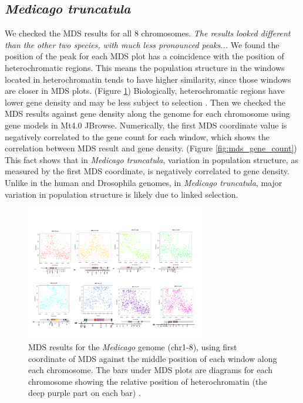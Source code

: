 \documentclass[11pt, oneside]{article}   	%
\newcommand{\plr}[1]{{\em \color{blue} #1}}
\begin{document}
\subsection{\textit{Medicago truncatula}}
We checked the MDS results for all 8 chromosomes. 
\plr{The results looked different than the other two species, with much less pronounced peaks...}
We found the position of the peak for each MDS plot has a coincidence with the position of heterochromatic regions. This means the population structure in the windows located in heterochromatin tends to have higher similarity, since those windows are closer in MDS plots. (Figure \ref{fig:mds_medicago}) Biologically,
heterochromatic regions have lower gene density and may be less subject to selection \citep{kulikova2001integration,paape2013selection}. Then we checked the MDS results against gene density along the genome for each chromosome using gene models in Mt4.0 JBrowse. Numerically, the first MDS coordinate value is negatively correlated to the gene count for each window, which shows the correlation between MDS result and gene density. (Figure \ref{fig:mds_gene_count}) 
This fact shows that in \textit{Medicago truncatula}, variation in population structure, as measured by the first MDS coordinate, is negatively correlated to gene density. 
Unlike in the human and Drosophila genomes, in \textit{Medicago truncatula}, major variation in population structure is likely due to linked selection. 

\begin{figure}
    \begin{center}
       \includegraphics[width=0.7\textwidth]{fig5}
    \end{center}
    \caption{
         MDS results for the \textit{Medicago} genome (chr1-8), using first coordinate of MDS against the middle position of each window along each chromosome. 
         The bars under MDS plots are diagrams for each chromosome showing the relative position of heterochromatin (the deep purple part on each bar) \citep{kulikova2004satellite, kulikova2001integration}.
        \label{fig:mds_medicago}
    }
\end{figure}
\end{document}
